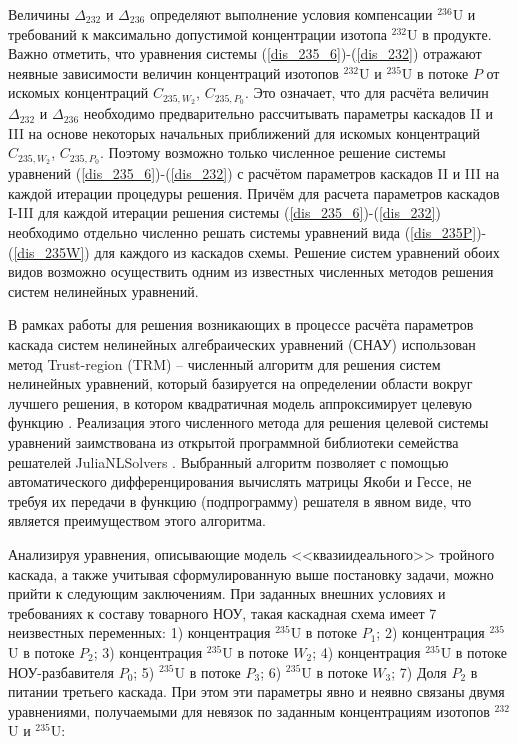 Величины $\Delta_{232}$ и $\Delta_{236}$ определяют выполнение условия компенсации $^{236}$U и требований к максимально допустимой концентрации изотопа $^{232}$U в продукте. Важно отметить, что уравнения системы (\ref{dis_235_6})-(\ref{dis_232}) отражают неявные зависимости величин концентраций изотопов $^{232}$U и $^{235}$U в потоке $P$ от искомых концентраций $C_{235,{W_2}}$, $C_{235,{P_0}}$. Это означает, что для расчёта величин $\Delta_{232}$ и $\Delta_{236}$ необходимо предварительно рассчитывать параметры каскадов II и III на основе некоторых начальных приближений для искомых концентраций $C_{235,{W_2}}$, $C_{235,{P_0}}$. Поэтому возможно только численное решение системы уравнений (\ref{dis_235_6})-(\ref{dis_232}) с расчётом параметров каскадов II и III на каждой итерации процедуры решения. Причём для расчета параметров каскадов I-III для каждой итерации решения системы (\ref{dis_235_6})-(\ref{dis_232}) необходимо отдельно численно решать системы уравнений вида (\ref{dis_235P})-(\ref{dis_235W}) для каждого из каскадов схемы. Решение систем уравнений обоих видов возможно осуществить одним из известных численных методов решения систем нелинейных уравнений. 

В рамках работы для решения возникающих в процессе расчёта параметров каскада систем нелинейных алгебраических уравнений (СНАУ) использован метод Trust-region (TRM) -- численный алгоритм для решения систем нелинейных уравнений, который базируется на определении области вокруг лучшего решения, в котором квадратичная модель аппроксимирует целевую функцию \cite{NumericalOptimization2006}. Реализация этого численного метода для решения целевой системы уравнений заимствована из открытой программной библиотеки семейства решателей JuliaNLSolvers \cite{mogensenJuliaNLSolversNLsolveJl2020}. Выбранный алгоритм позволяет с помощью автоматического дифференцирования вычислять матрицы Якоби и Гессе, не требуя их передачи в функцию (подпрограмму) решателя в явном виде, что является преимуществом этого алгоритма.

Анализируя уравнения, описывающие модель <<квазиидеального>> тройного каскада, а также учитывая сформулированную выше постановку задачи, можно прийти к следующим заключениям. При заданных внешних условиях и требованиях к составу товарного НОУ, такая каскадная схема имеет 7 неизвестных переменных: 1) концентрация $^{235}$U в потоке $P_{1}$; 2) концентрация $^{235}$U в потоке $P_{2}$; 3) концентрация $^{235}$U в потоке $W_{2}$; 4) концентрация $^{235}$U в потоке НОУ-разбавителя $P_{0}$; 5) $^{235}$U в потоке $P_{3}$; 6) $^{235}$U в потоке $W_{3}$; 7) Доля $P_2$ в питании третьего каскада. При этом эти параметры явно и неявно связаны двумя уравнениями, получаемыми для невязок по заданным концентрациям изотопов $^{232}$U и $^{235}$U:

